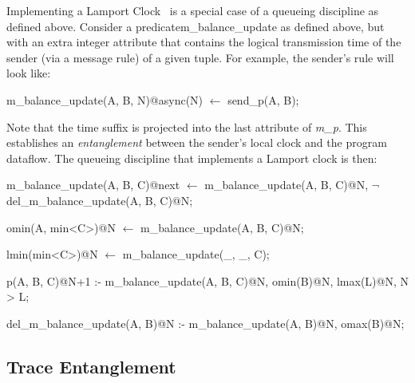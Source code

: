 Implementing a Lamport Clock~\cite{timeclocks} is a special case of a queueing discipline as defined above.
Consider a predicate{m\_balance\_update} as defined above, but with an extra integer attribute that contains the logical transmission
time of the sender (via a message rule) of a given tuple.  For example, the sender's rule will look like: 


\begin{Dedalus}
m\_balance\_update(A, B, N)@async(N) \(\leftarrow\)
  send\_p(A, B);
\end{Dedalus}

Note that the time suffix is projected into the last attribute of \emph{m\_p}.  This establishes an \emph{entanglement} between
the sender's local clock and the program dataflow.  The queueing discipline that implements a
Lamport clock is then:

\begin{Dedalus}

m\_balance\_update(A, B, C)@next \(\leftarrow\)
  m\_balance\_update(A, B, C)@N,
  \(\lnot\) del\_m\_balance\_update(A, B, C)@N;

omin(A, min<C>)@N \(\leftarrow\)
  m\_balance\_update(A, B, C)@N;

lmin(min<C>)@N \(\leftarrow\)
  m\_balance\_update(_, _, C);

p(A, B, C)@N+1 :-
  m\_balance\_update(A, B, C)@N,
  omin(B)@N,
  lmax(L)@N,
  N > L;

del\_m\_balance\_update(A, B)@N :-
  m\_balance\_update(A, B)@N,
  omax(B)@N;
  
\end{Dedalus}



\subsection{Trace Entanglement}


